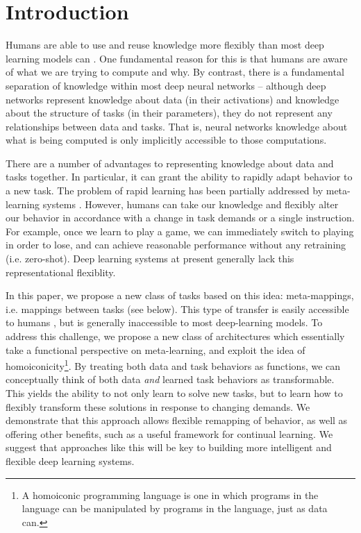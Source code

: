 \documentclass{article}
\begin{document}
\section{Introduction}
Humans are able to use and reuse knowledge more flexibly than most deep learning models can \citep[e.g.][]{Lake2016, Marcus2018}. One fundamental reason for this is that humans are aware of what we are trying to compute and why. By contrast, there is a fundamental separation of knowledge within most deep neural networks -- although deep networks represent knowledge about data (in their activations) and knowledge about the structure of tasks (in their parameters), they do not represent any relationships between data and tasks. That is, neural networks knowledge about what is being computed is only implicitly accessible to those computations. \par
There are a number of advantages to representing knowledge about data and tasks together. In particular, it can grant the ability to rapidly adapt behavior to a new task. The problem of rapid learning has been partially addressed by meta-learning systems \citep[e.g.][]{Vinyals2016, Finn2017a}. However, humans can take our knowledge and flexibly alter our behavior in accordance with a change in task demands or a single instruction. For example, once we learn to play a game, we can immediately switch to playing in order to lose, and can achieve reasonable performance without any retraining (i.e. zero-shot). Deep learning systems at present generally lack this representational flexiblity. \par
In this paper, we propose a new class of tasks based on this idea: meta-mappings, i.e. mappings between tasks (see below). This type of transfer is easily accessible to humans \citep{Lake2016}, but is generally inaccessible to most deep-learning models. To address this challenge, we propose a new class of architectures which essentially take a functional perspective on meta-learning, and exploit the idea of homoiconicity\footnote{A homoiconic programming language is one in which programs in the language can be manipulated by programs in the language, just as data can.}. By treating both data and task behaviors as functions, we can conceptually think of both data \emph{and} learned task behaviors as transformable. This yields the ability to not only learn to solve new tasks, but to learn how to flexibly transform these solutions in response to changing demands. We demonstrate that this approach allows flexible remapping of behavior, as well as offering other benefits, such as a useful framework for continual learning. We suggest that approaches like this will be key to building more intelligent and flexible deep learning systems. \par
\end{document}
